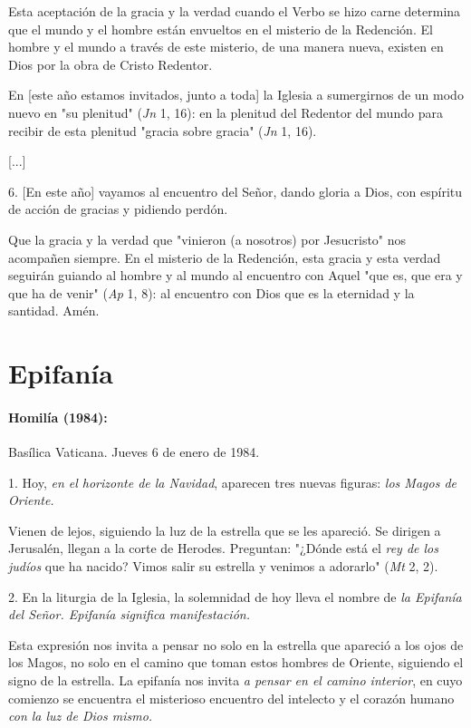 \begin{body}
Esta aceptación de la gracia y la verdad cuando el Verbo se hizo carne determina que el mundo y el hombre están envueltos en el misterio de la Redención. El hombre y el mundo a través de este misterio, de una manera nueva, existen en Dios por la obra de Cristo Redentor.

En {[}este año estamos invitados, junto a toda{]} la Iglesia a sumergirnos de un modo nuevo en "su plenitud" (\emph{Jn} 1, 16): en la plenitud del Redentor del mundo para recibir de esta plenitud "gracia sobre gracia" (\emph{Jn} 1, 16).

{[}...{]}

6. {[}En este año{]} vayamos al encuentro del Señor, dando gloria a Dios, con espíritu de acción de gracias y pidiendo perdón.

Que la gracia y la verdad que "vinieron (a nosotros) por Jesucristo" nos acompañen siempre. En el misterio de la Redención, esta gracia y esta verdad seguirán guiando al hombre y al mundo al encuentro con Aquel "que es, que era y que ha de venir" (\emph{Ap} 1, 8): al encuentro con Dios que es la eternidad y la santidad. Amén.

\chapter{Epifanía}

\subsubsection{Homilía (1984): }

Basílica Vaticana. Jueves 6 de enero de 1984.

1. Hoy, \emph{en el horizonte de la Navidad}, aparecen tres nuevas figuras: \emph{los Magos de Oriente.}

Vienen de lejos, siguiendo la luz de la estrella que se les apareció. Se dirigen a Jerusalén, llegan a la corte de Herodes. Preguntan: "¿Dónde está el \emph{rey de los judíos} que ha nacido? Vimos salir su estrella y venimos a adorarlo" (\emph{Mt} 2, 2).

2. En la liturgia de la Iglesia, la solemnidad de hoy lleva el nombre de \emph{la Epifanía del Señor. Epifanía significa manifestación.}

Esta expresión nos invita a pensar no solo en la estrella que apareció a los ojos de los Magos, no solo en el camino que toman estos hombres de Oriente, siguiendo el signo de la estrella. La epifanía nos invita \emph{a pensar en el camino interior}, en cuyo comienzo se encuentra el misterioso encuentro del intelecto y el corazón humano \emph{con la luz de Dios mismo.}


\end{body}
